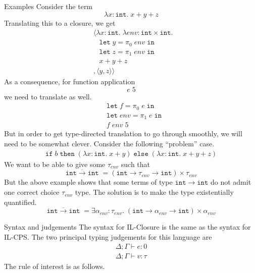 \documentclass{amsart}
\newcommand{\kwd}[1]{\ensuremath{\mathtt{#1}}}
\newcommand{\intt}{\ensuremath{\mathtt{int}}}
\newcommand{\vect}[1]{\langle #1 \rangle}
\begin{document}
\begin{section}{Examples}
    Consider the term
        \[
            \lambda x : \intt. \; x + y + z
        \]
    Translating this to a closure, we get
        \begin{align*}
            &\vect{\lambda x : \intt. \; \lambda env : \intt \times \intt. \; \\ 
            & \; \; \; \kwd{let} \; y = \pi_0 \; env \; \kwd{in} \\
            & \; \; \; \kwd{let} \; z = \pi_1 \; env \; \kwd{in} \\ 
            & \; \; \; x + y + z \\
            &, \vect{y, z}}
        \end{align*}
    As a consequence, for function application
        \[
            e \; 5
        \]
    we need to translate as well.
        \begin{align*}
            &\kwd{let} \; f = \pi_0 \; e \; \kwd{in} \\
            &\kwd{let} \; env = \pi_1 \; e \; \kwd{in} \\
            &f \; env \; 5
        \end{align*}
    But in order to get type-directed translation to go through smoothly, we will need to be somewhat clever. Consider the following ``problem'' case.
        \begin{align*}
            \kwd{if} \; b \; \kwd{then} \; (\lambda x : \intt. \; x + y) \; \kwd{else} \; (\lambda x : \intt. \; x + y + z)
        \end{align*}
    We want to be able to give some $\tau_{env}$ such that
        \[
            \overline{\intt \to \intt} \; = (\intt \to \tau_{env} \to \intt) \times \tau_{env}
        \]
    But the above example shows that some terms of type $\intt \to \intt$ do not admit one correct choice $\tau_{env}$ type. The solution is to make the type existentially quantified.
        \[
            \overline{\intt \to \intt} \; = \exists \alpha_{env} : \tau_{env}. \; (\intt \to \alpha_{env} \to \intt) \times \alpha_{env}
        \]
\end{section}

\begin{section}{Syntax and judgements}
    The syntax for IL-Closure is the same as the syntax for IL-CPS. The two principal typing judgements for this language are
        \[
            \begin{array}{l}
                \Delta ; \Gamma \vdash e : 0 \\
                \Delta ; \Gamma \vdash v : \tau
            \end{array}
        \]
    The rule of interest is as follows.
\end{section}
\end{document}
